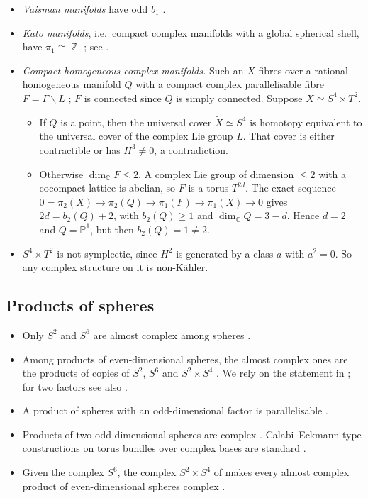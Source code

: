 \documentclass{article}
\DeclareMathOperator{\Z}{\mathbb{Z}}
\theoremstyle{definition}
\theoremstyle{plain}
\newcommand{\C}{\mathbb{C}}
\newcommand{\PP}{\mathbb{P}}
\begin{document}
\begin{itemize}
  $b_3(S^4\times T^2)=0$.
\item \emph{Vaisman manifolds} have odd $b_1$ \cite{Vaisman82}.
\item \emph{Kato manifolds}, i.e.\ compact complex manifolds with a global spherical
  shell, have $\pi_1\cong\Z$ \cite{Kato77}; see \cite[\S1]{IOP19}.
\item \emph{Compact homogeneous complex manifolds.} Such an $X$ fibres over a
  rational homogeneous manifold $Q$ with a compact complex parallelisable fibre
  $F=\Gamma\backslash L$ \cite{Tits62,Wang54}; $F$ is connected since $Q$ is simply
  connected. Suppose $X\simeq S^4\times T^2$.
  \begin{itemize}
  \item If $Q$ is a point, then the universal cover $\widetilde X\simeq S^4$ is
    homotopy equivalent to the universal cover of the complex Lie group $L$. That cover
    is either contractible or has $H^3\ne0$, a contradiction.
  \item Otherwise $\dim_\C F\le2$. A complex Lie group of dimension $\le2$ with a
    cocompact lattice is abelian, so $F$ is a torus $T^{2d}$. The exact sequence
    $0=\pi_2(X)\to\pi_2(Q)\to\pi_1(F)\to\pi_1(X)\to0$ gives $2d=b_2(Q)+2$, with
    $b_2(Q)\ge1$ and $\dim_\C Q=3-d$. Hence $d=2$ and $Q=\PP^1$, but then
    $b_2(Q)=1\ne2$.
  \end{itemize}
\item $S^4\times T^2$ is not symplectic, since $H^2$ is generated by a class $a$ with
  $a^2=0$. So any complex structure on it is non-K\"ahler.
\end{itemize}

\subsection*{Products of spheres}
\begin{itemize}
\item Only $S^2$ and $S^6$ are almost complex among spheres \cite{BorelSerre53}.
\item Among products of even-dimensional spheres, the almost complex ones are the
  products of copies of $S^2$, $S^6$ and $S^2\times S^4$ \cite[Thm.~3.1]{Sutherland65}. We
  rely on the statement in \cite{LLZ26}; for two factors see also
  \cite{DattaSubramanian90}.
\item A product of spheres with an odd-dimensional factor is parallelisable
  \cite{Staples67}.
\item Products of two odd-dimensional spheres are complex \cite{CalabiEckmann53}.
  Calabi--Eckmann type constructions on torus bundles over complex bases are standard
  \cite{Morimoto63,Hofer93,GoldsteinProkushkin04,GGP08}.
\item Given the complex $S^6$, the complex $S^2\times S^4$ of \cite{LLZ26} makes every
  almost complex product of even-dimensional spheres complex \cite[Cor.~1.3]{LLZ26}.
\end{itemize}
\end{document}
